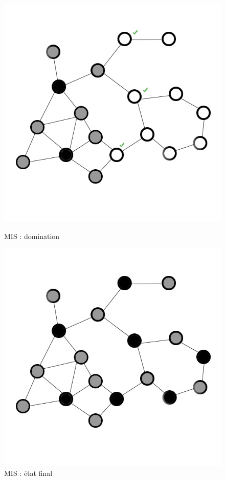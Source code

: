 \begin{figure}
    \begin{minipage}[c]{.46\linewidth}
        \includegraphics{images/mis5.jpg}
        \caption{MIS : domination}
        \label{mis5}
    \end{minipage} \hfill
    \begin{minipage}[c]{.46\linewidth}
        \includegraphics{images/mis6.jpg}
    \caption{MIS : état final}
    \label{mis6}
    \end{minipage}
\end{figure}

